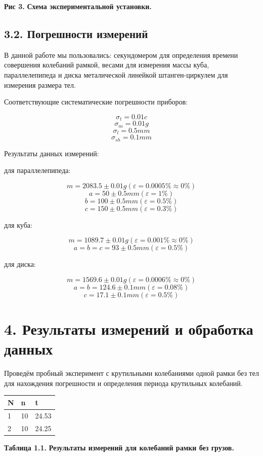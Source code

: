 \begin{flushright}
{\scriptsize \textbf{Рис 3.} \textbf {Схема экспериментальной установки.}}
\end{flushright}

\subsection*{3.2. Погрешности измерений}

    В данной работе мы пользовались: 
    секундомером для определения времени совершения колебаний рамкой, 
    весами для измерения массы куба, параллелепипеда и диска
    металической линейкой
    штанген-циркулем для измерения размера тел.
    
    
    Соответствующие систематические погрешности приборов:
    
\[\sigma_{t} = 0.01 c\]
\[\sigma_{m} = 0.01 g\]
\[\sigma_{l} = 0.5 mm\]
\[\sigma_{sh} = 0.1 mm\]

    Результаты данных измерений:
    
    для параллелепипеда:
    
\[m = 2083.5 \pm 0.01 g  (\varepsilon = 0.0005 \% \approx 0\%)\]
\[a = 50 \pm 0.5 mm  (\varepsilon = 1 \%)\]
\[b = 100 \pm 0.5 mm  (\varepsilon = 0.5 \%)\]
\[c = 150 \pm 0.5 mm  (\varepsilon = 0.3 \%)\]

    для куба:

\[m = 1089.7 \pm 0.01 g  (\varepsilon = 0.001 \% \approx 0 \%)\]
\[a = b = c = 93 \pm 0.5 mm  (\varepsilon = 0.5\%)\]

    для диска:

\[m = 1569.6 \pm 0.01 g     (\varepsilon = 0.0006 \% \approx 0 \%)\]
\[a = b = 124.6 \pm 0.1 mm  (\varepsilon = 0.08 \%)\]
\[c = 17.1 \pm 0.1 mm  (\varepsilon = 0.5 \%)\]



\section*{4. Результаты измерений и обработка данных}

    Проведём пробный эксперимент с крутильными колебаниями одной рамки без тел для нахождения погрешности и определения периода крутильных колебаний.
    
\begin{table}[h!]
\centering
\begin{tabular}{|l|l|l|}
\hline
N & n  & t     \\ \hline
1 & 10 & 24.53 \\ \hline
2 & 10 & 24.25 \\ \hline
\end{tabular}
\begin{flushright}
{\scriptsize \textbf{Таблица 1.1.} \textbf {Результаты измерений для колебаний рамки без грузов.}}
\end{flushright}
\end{table}


